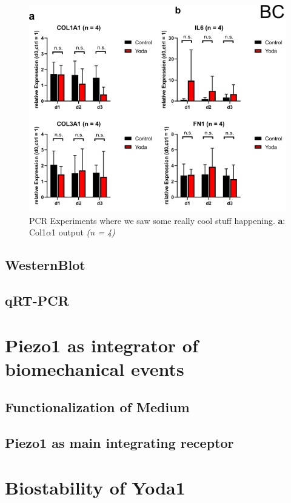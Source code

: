\begin{figure}[h!]
    \centering
    \includegraphics[scale = 0.6]{Collection.png}
    \caption{
    PCR Experiments where we saw some really cool stuff happening. \textbf{a}: Col1$\alpha$1 output \textit{(n = 4)}
    }
    \label{fig:my_label}
\end{figure}

\subsection{WesternBlot}

\kant[42]
\subsection{qRT-PCR}

\section{Piezo1 as integrator of biomechanical events}
\subsection{Functionalization of Medium}
\subsection{Piezo1 as main integrating receptor}

\section{Biostability of Yoda1}
\kant[42][1-3]